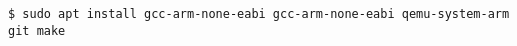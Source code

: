 \secdown


\begin{lstlisting}
$ sudo apt install gcc-arm-none-eabi gcc-arm-none-eabi qemu-system-arm git make
\end{lstlisting}

\secup
